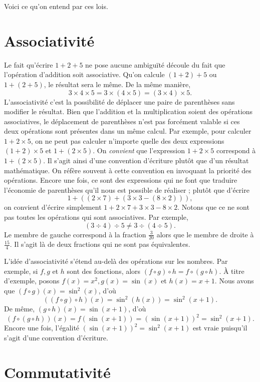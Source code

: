 \documentclass[
  letterpaper,
  DIV=11,
  numbers=noendperiod,
  oneside]{scrreprt}
\theoremstyle{definition}
\theoremstyle{remark}
\begin{document}
Voici ce qu'on entend par ces lois.

\hypertarget{associativituxe9}{%
\section{Associativité}\label{associativituxe9}}

Le fait qu'écrire \(1+2+5\) ne pose aucune ambiguïté découle du fait que
l'opération d'addition soit associative. Qu'on calcule \((1+2)+5\) ou
\(1+(2+5)\), le résultat sera le même. De la même manière,
\[3\times 4\times 5=3\times (4\times 5)=(3\times 4)\times 5.\]
L'associativité c'est la possibilité de déplacer une paire de
parenthèses sans modifier le résultat. Bien que l'addition et la
multiplication soient des opérations associatives, le déplacement de
parenthèses n'est pas forcément valable si ces deux opérations sont
présentes dans un même calcul. Par exemple, pour calculer
\(1+2\times 5\), on ne peut pas calculer n'importe quelle des deux
expressions \((1+2)\times 5\) et \(1+(2\times 5)\). On \emph{convient}
que l'expression \(1+2\times 5\) correspond à \(1+(2\times 5)\). Il
s'agit ainsi d'une convention d'écriture plutôt que d'un résultat
mathématique. On réfère souvent à cette convention en invoquant la
priorité des opérations. Encore une fois, ce sont des expressions qui ne
font que traduire l'économie de parenthèses qu'il nous est possible de
réaliser ; plutôt que d'écrire
\[1+((2\times 7)+(3\times 3-(8\times 2))),\] on convient d'écrire
simplement \(1+2\times 7+3\times 3-8\times 2\). Notons que ce ne sont
pas toutes les opérations qui sont associatives. Par exemple,
\[(3\div 4)\div 5\neq 3\div(4\div 5).\] Le membre de gauche correspond à
la fraction \(\frac{3}{20}\) alors que le membre de droite à
\(\frac{15}{4}\). Il s'agit là de deux fractions qui ne sont pas
équivalentes.

L'idée d'associativité s'étend au-delà des opérations sur les nombres.
Par exemple, si \(f,g\) et \(h\) sont des fonctions, alors
\((f\circ g)\circ h=f\circ (g\circ h)\). À titre d'exemple, posons
\(f(x)=x^2, g(x)=\sin(x)\) et \(h(x)=x+1\). Nous avons que
\((f\circ g)(x)=\sin^2(x)\), d'où
\[\left((f\circ g)\circ h\right)(x)=\sin^2(h(x))=\sin^2(x+1).\] De même,
\((g\circ h)(x)=\sin(x+1)\), d'où
\[\left(f\circ (g\circ h)\right)(x)=f(\sin(x+1))=(\sin(x+1))^2=\sin^2(x+1).\]
Encore une fois, l'égalité \((\sin (x+1))^2=\sin^2(x+1)\) est vraie
puisqu'il s'agit d'une convention d'écriture.

\hypertarget{commutativituxe9}{%
\section{Commutativité}\label{commutativituxe9}}
\end{document}
